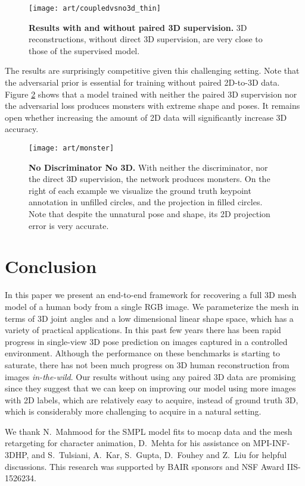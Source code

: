 \documentclass[10pt,twocolumn,letterpaper]{article}
\begin{document}
\begin{figure}[t]
  \centering
  \texttt{[image: art/coupledvsno3d\_thin]}
  \caption{{\small {\bf Results with and without paired 3D
        supervision.} 
3D reconstructions, without direct 3D supervision, are very
      close to those of the supervised model.}}
  \label{fig:no3d}
  \vspace{-1em}
\end{figure}
 
The results are surprisingly competitive given this
challenging setting. 
Note that the adversarial prior is essential for training
without paired 2D-to-3D data. 
Figure \ref{fig:no3d} shows that a model trained with neither the paired 3D supervision
nor the adversarial loss produces monsters with extreme shape and
poses. 
It remains open whether  increasing the amount of 2D data will significantly increase 3D accuracy.  

\begin{figure}[t]
  \centering
  \texttt{[image: art/monster]}
  \caption{{\small {\bf No Discriminator No 3D.} With neither the
      discriminator, nor the direct 3D supervision, the network
    produces monsters. On the right of each example we visualize the ground
    truth keypoint annotation in unfilled circles, and the projection in filled
    circles. Note that despite the unnatural pose and shape, its 2D projection error is very accurate.}}
\label{fig:no3d}
\vspace{-1em}
\end{figure}
 \section{Conclusion}
\label{sec:discussion}
In this paper we present an end-to-end framework for recovering a full 3D mesh model of a
human body from a single RGB image. We parameterize the mesh in terms of 3D
joint angles and a low dimensional linear shape space, which has a variety of practical
applications. In this past few years there has been rapid progress in single-view 3D pose
prediction on images captured in a controlled environment. Although the performance on these benchmarks is starting to saturate, there
has not been much progress on 3D human reconstruction from images \emph{in-the-wild}. Our
results without using any paired 3D data are promising since they suggest that we
can keep on improving our model using more images with 2D labels,
which are relatively easy to acquire, instead of  ground truth 3D,
which is considerably more challenging to acquire in a natural setting.

\vspace{3mm}  
{
We thank N.~Mahmood for the SMPL model fits to mocap
data and  the mesh retargeting for character animation, D.~Mehta for his assistance on MPI-INF-3DHP, and S.~Tulsiani,
A.~Kar, S.~Gupta, D.~Fouhey and Z.~Liu for helpful
discussions. This research was supported by BAIR sponsors and NSF Award IIS-1526234.}
 

\small


\end{document}
